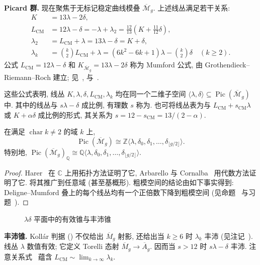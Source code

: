 \noindent\textbf{Picard 群.} 现在聚焦于无标记稳定曲线模叠 $\overline{\mathcal M}_g$. 上述线丛满足若干关系:
\begin{equation}\label{src:6.10.10}
\begin{aligned}
K&=13\lambda-2\delta,\\
L_{\mathrm{CM}}&=12\lambda-\delta=-\lambda+\lambda_2=\frac{12}{13}\left(K+\frac{11}{12}\delta\right),\\
\lambda_2&=L_{\mathrm{CM}}+\lambda=13\lambda-\delta=K+\delta,\\
\lambda_k&=\binom{k}{2}L_{\mathrm{CM}}+\lambda=(6k^2-6k+1)\lambda-\binom{k}{2}\delta\quad(k\geq2).
\end{aligned}
\end{equation}
公式 $L_{\mathrm{CM}}=12\lambda-\delta$ 和 $K_{\overline{\mathcal M}_g}=13\lambda-2\delta$ 称为 Mumford 公式, 由 Grothendieck--Riemann--Roch 建立; 见~\cite[第 5 节]{Mum83}, \cite[第 3.E 节]{HM98} 与~\cite[第 XIII.7 节]{ACG11}.

这些公式表明, 线丛 $K,\allowbreak \lambda,\allowbreak \delta,\allowbreak L_{\mathrm{CM}},\allowbreak \lambda_k$ 均在同一个二维子空间 $\langle\lambda,\allowbreak \delta\rangle\subseteq\operatorname{Pic}(\overline{\mathcal M}_g)$ 中. 其中的线丛与 $s\lambda-\delta$ 成比例, 有理数 $s$ 称为. 也可将线丛表为与 $L_{\mathrm{CM}}+s_{\mathrm{CM}}\lambda$ 或 $K+\alpha\delta$ 成比例的形式, 其关系为 $s=12-s_{\mathrm{CM}}=13/(2-\alpha)$.
\newpage
\begin{theorem}\label{src:6.10.11}
在满足 $\operatorname{char}k\ne2$ 的域 $k$ 上,
\[
\operatorname{Pic}(\overline{\mathcal M}_g)\cong\mathbb Z\langle\lambda,\delta_0,\delta_1,\ldots,\delta_{\lfloor g/2\rfloor}\rangle.
\]
特别地, $\operatorname{Pic}(\overline{\mathcal M}_g)_{\mathbb Q}\cong\mathbb Q\langle\lambda,\allowbreak \delta_0,\allowbreak \delta_1,\allowbreak \ldots,\allowbreak \delta_{\lfloor g/2\rfloor}\rangle$.
\end{theorem}
\begin{proof}
Harer~\cite{Har83,Har88} 在 $\mathbb C$ 上用拓扑方法证明了它, Arbarello 与 Cornalba~\cite{AC87} 用代数方法证明了它. \cite{FV23} 将其推广到任意域 (甚至基概形). 粗模空间的结论由如下事实得到: Deligne--Mumford 叠上的每个线丛均有一个正倍数下降到粗模空间 (见命题~ 与习题~).
\end{proof}
\begin{figure}[htbp]
\centering
\caption{$\lambda\delta$ 平面中的有效锥与丰沛锥}\label{src:6.10.12}
\end{figure}
\noindent\textbf{丰沛锥.} Kollár 判据 () 不仅给出 $\overline M_g$ 射影, 还给出当 $k\geq6$ 时 $\lambda_k$ 丰沛 (见注记~). 线丛 $\lambda$ 数值有效; 它定义 Torelli 态射 $\overline M_g\to\overline A_g$. 因而当 $s>12$ 时 $s\lambda-\delta$ 丰沛. 注意关系式~ 蕴含 $L_{\mathrm{CM}}\sim\lim_{k\to\infty}\lambda_k$.

